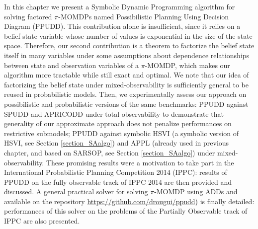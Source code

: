 In this chapter we present a Symbolic Dynamic Programming
algorithm for solving factored $\pi$-MOMDPs named Possibilistic Planning Using
Decision Diagram (PPUDD). 
This contribution alone is insufficient, since it
relies on a belief state variable whose number of values is exponential
in the size of the state space. 
Therefore, our second contribution is a theorem
to factorize the belief state 
itself in many variables under some assumptions
about dependence relationships between state and observation 
variables of a $\pi$-MOMDP, 
which makes our algorithm more tractable while still exact and
optimal. We note that our idea of factorizing the belief state under
mixed-observability is sufficiently general to be reused in probabilistic
models.
Then, we experimentally assess our approach on possibilistic and
probabilistic versions of the same benchmarks: PPUDD against SPUDD
and APRICODD \cite{St-aubin00apricodd:approximate}
under total observability to demonstrate that generality of our approximate approach does
not penalize performances on restrictive submodels; PPUDD against symbolic
HSVI \cite{Sim:2008:SHS:1620163.1620241}
(a symbolic version of HSVI, see Section \ref{section_SAalgo}) and APPL
\cite{Kurniawati-RSS08,OngShaoHsuWee-IJRR10}
(already used in previous chapter, and based on SARSOP, see Section \ref{section_SAalgo}) 
under mixed-observability. 
These promising results were a motivation to take part
in the International Probabilistic Planning Competition 2014 (IPPC):
results of PPUDD on the fully observable track of IPPC 2014
are then provided and discussed. 
A general practical solver for solving $\pi$-MOMDP using ADDs
and available on the repository \url{https://github.com/drougui/ppudd})
is finally detailed:
performances of this solver 
on the problems of the Partially Observable track of IPPC
are also presented.

